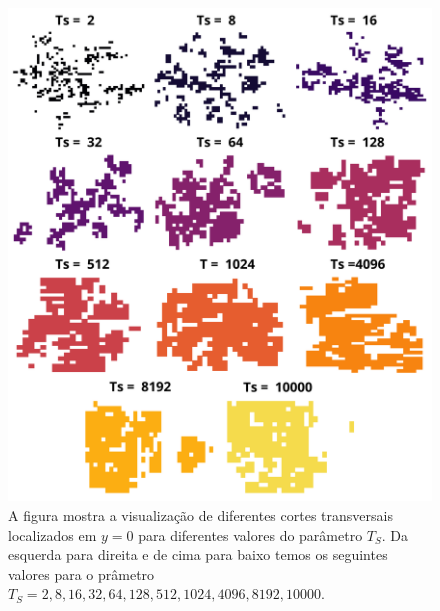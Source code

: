 \documentclass{article}
\begin{document}
    \begin{figure}[H]
        \centering
        \includegraphics[width=\textwidth]{figures/cs_all.png}
        \caption{A figura mostra a visualização de diferentes cortes transversais localizados em \(y=0\) para diferentes 
        valores do parâmetro \(T_{S}\). Da esquerda para direita e de cima para baixo temos os seguintes valores para o 
        prâmetro \(T_{S}=2,8,16,32,64,128,512,1024,4096,8192, 10000\).} 
        \label{R3}
    \end{figure}
\end{document}
